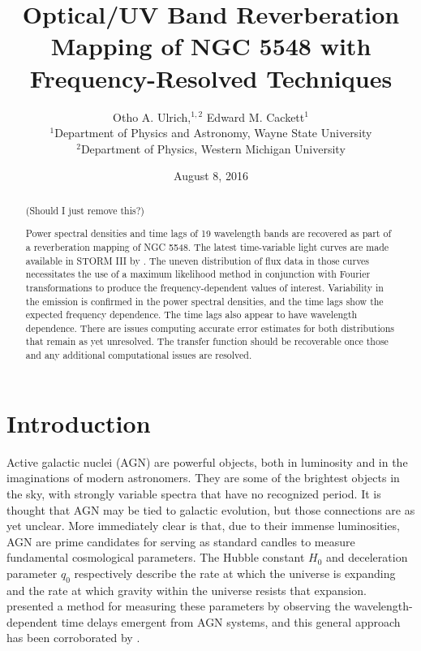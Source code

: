 \documentclass[11pt,letterpaper]{article}
\begin{document}
\title{Optical/UV Band
Reverberation Mapping of NGC 5548 with Frequency-Resolved Techniques}

\author{Otho A. Ulrich,$^{1,2}$ Edward M. Cackett$^{1}$
\\
$^{1}$Department of Physics and Astronomy, Wayne State University\\
$^{2}$Department of Physics, Western Michigan University\\
}
\date{August 8, 2016}

\maketitle

\begin{abstract}

(Should I just remove this?)

Power spectral densities and time lags of 19 wavelength bands are recovered as part of a reverberation mapping of NGC 5548. The latest time-variable light curves are made available in STORM III by \cite{2016ApJ...821...56F}. The uneven distribution of flux data in those curves necessitates the use of a maximum likelihood method in conjunction with Fourier transformations to produce the frequency-dependent values of interest. Variability in the emission is confirmed in the power spectral densities, and the time lags show the expected frequency dependence. The time lags also appear to have wavelength dependence. There are issues computing accurate error estimates for both distributions that remain as yet unresolved. The transfer function should be recoverable once those and any additional computational issues are resolved.

\end{abstract}

\section{Introduction}

Active galactic nuclei (AGN) are powerful objects, both in luminosity and in the imaginations of modern astronomers. They are some of the brightest objects in the sky, with strongly variable spectra that have no recognized period. It is thought that AGN may be tied to galactic evolution, but those connections are as yet unclear. More immediately clear is that, due to their immense luminosities, AGN are prime candidates for serving as standard candles to measure fundamental cosmological parameters. The Hubble constant $H_0$ and deceleration parameter $q_0$ respectively describe the rate at which the universe is expanding and the rate at which gravity within the universe resists that expansion. \cite{1999MNRAS.302L..24C} presented a method for measuring these parameters by observing the wavelength-dependent time delays emergent from AGN systems, and this general approach has been corroborated by \cite{2007MNRAS.380..669C}.
\end{document}
